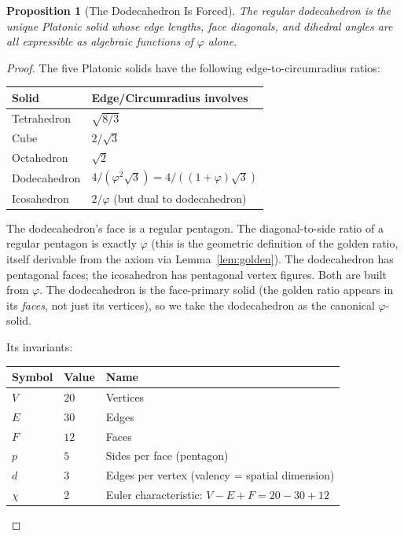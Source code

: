 \documentclass[11pt,a4paper]{article}
\theoremstyle{plain}
\newtheorem{proposition}[theorem]{Proposition}
\theoremstyle{definition}
\newcommand{\vp}{\varphi}
\begin{document}
\begin{proposition}[The Dodecahedron Is Forced]\label{prop:dodec}
The regular dodecahedron is the unique Platonic solid whose edge
lengths, face diagonals, and dihedral angles are all expressible as
algebraic functions of $\vp$ alone.
\end{proposition}

\begin{proof}
The five Platonic solids have the following edge-to-circumradius ratios:
\begin{center}
\begin{tabular}{@{}ll@{}}
\toprule
Solid & Edge/Circumradius involves \\
\midrule
Tetrahedron & $\sqrt{8/3}$ \\
Cube & $2/\sqrt{3}$ \\
Octahedron & $\sqrt{2}$ \\
Dodecahedron & $4/(\vp^2\sqrt{3}) = 4/((1+\vp)\sqrt{3})$ \\
Icosahedron & $2/\vp$ (but dual to dodecahedron) \\
\bottomrule
\end{tabular}
\end{center}

The dodecahedron's face is a regular pentagon.  The diagonal-to-side
ratio of a regular pentagon is exactly $\vp$ (this is the geometric
definition of the golden ratio, itself derivable from the axiom via
Lemma~\ref{lem:golden}).  The dodecahedron has pentagonal faces;
the icosahedron has pentagonal vertex figures.  Both are built from
$\vp$.  The dodecahedron is the face-primary solid (the golden ratio
appears in its \emph{faces}, not just its vertices), so we take the
dodecahedron as the canonical $\vp$-solid.

Its invariants:
\begin{center}
\begin{tabular}{@{}lll@{}}
\toprule
Symbol & Value & Name \\
\midrule
$V$ & $20$ & Vertices \\
$E$ & $30$ & Edges \\
$F$ & $12$ & Faces \\
$p$ & $5$ & Sides per face (pentagon) \\
$d$ & $3$ & Edges per vertex (valency = spatial dimension) \\
$\chi$ & $2$ & Euler characteristic: $V - E + F = 20 - 30 + 12$ \\
\bottomrule
\end{tabular}
\end{center}
\end{proof}
\end{document}
